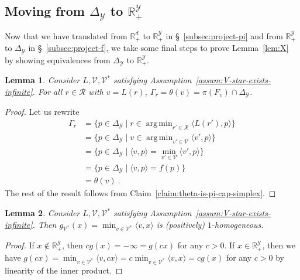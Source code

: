 \documentclass[11pt]{article}
\newcommand{\reals}{\mathbb{R}}
\newcommand{\simplex}{\Delta_\Y}
\newcommand{\R}{\mathcal{R}}
\newcommand{\V}{\mathcal{V}}
\newcommand{\Y}{\mathcal{Y}}
\newcommand{\inprod}[2]{\langle #1, #2 \rangle}%
\DeclareMathOperator*{\argmin}{arg\,min}
\newtheorem{lemma}{Lemma}
\begin{document}
\subsection{Moving from $\simplex$ to $\reals^\Y_+$}
Now that we have translated from $\reals^d_+$ to $\reals^\Y_+$ in \S~\ref{subsec:project-pi} and from $\reals^\Y_+$ to $\simplex$ in \S~\ref{subsec:project-f}, we take some final steps to prove Lemma~\ref{lem:X} by showing equivalences from $\simplex$ to $\reals^\Y_+$.
\begin{lemma}\label{lem:level-set-is-projected-face}
  Consider $L, \V, \V^*$ satisfying Assumption~\ref{assum:V-star-exists-infinite}.
  For all $r \in \R$ with $v = L(r)$, $\Gamma_r = \theta(v) = \pi(F_{v}) \cap \simplex$.
\end{lemma}
\begin{proof}
  Let us rewrite
  \begin{align*}
    \Gamma_r
    &= \{p \in \simplex \mid r \in \argmin_{r' \in \R} \inprod{L(r')}{p}\}\\
    &= \{p \in \simplex \mid v \in \argmin_{v' \in \V} \inprod{v'}{p}\}\\
    &= \{p \in \simplex \mid \inprod{v}{p} = \min_{v' \in \V}\inprod{v'}{p}\}\\
    &= \{p \in \simplex \mid \inprod{v}{p} = f(p) \}\\
    &= \theta(v)~.
  \end{align*}
  The rest of the result follows from Claim~\ref{claim:theta-is-pi-cap-simplex}.
   
\end{proof}


\begin{lemma}\label{lem:g-1-homog}
	Consider $L, \V, \V^*$ satisfying Assumption~\ref{assum:V-star-exists-infinite}.
	Then $g_{\V^*}(x) = \min_{v \in \V^*}\inprod{v}{x}$ is (positively) $1$-homogeneous.
\end{lemma}
\begin{proof}
	If $x \not \in \reals^\Y_+$, then $c g(x) = -\infty = g(cx)$ for any $c > 0$.
	If $x \in \reals^\Y_+$, then we have $g(cx) = \min_{v \in \V^*}\inprod{v}{cx} = c \min_{v \in \V^*}\inprod{v}{x} = c g(x)$ for any $c > 0$ by linearity of the inner product.
\end{proof}
\end{document}
